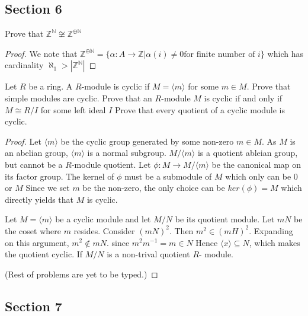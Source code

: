 \documentclass[Aluffi.tex]{subfiles}
\begin{document}
\subsection{Section 6}

\begin{problem}
Prove that $\mathbb{Z}^{\mathbb{N}} \not\cong \mathbb{Z}^{\oplus \mathbb{N}}$
\end{problem}

\begin{proof}
We note that $\mathbb{Z}^{\oplus \mathbb{N}} = \{ \alpha: A \rightarrow \mathbb{Z} \vert \alpha(i) \neq 0 \text{for finite number of $i$} \}$ which has cardinality $\aleph_1 > |\mathbb{Z}^{\mathbb{N}}|$ 
\end{proof}


\begin{problem}
Let $R$ be a ring. A $R$-module is cyclic if $M = \langle m \rangle$ for some $m \in M$. Prove that simple modules are cyclic. Prove that an $R$-module $M$ is cyclic if and only if $M \cong R/I$ for some left ideal $I$ Prove that every quotient of a cyclic module is cyclic. 
\end{problem}

\begin{proof}
Let $\langle m \rangle$ be the cyclic group generated by some non-zero $m \in M$. As $M$ is an abelian group, $\langle m \rangle$ is a normal subgroup. $M / \langle m \rangle$ is a quotient ableian group, but cannot be a $R$-module quotient. Let $\phi: M \rightarrow M / {\langle m \rangle}$ be the canonical map on its factor group.
The kernel of $\phi$ must be a submodule of $M$ which only can be $0$ or $M$ Since we set $m$ be the non-zero, the only choice can be $ker(\phi) = M$ which directly yields that $M$ is cyclic. \par
Let $M = \langle m \rangle$ be a cyclic module and let $M/N$ be its quotient module. Let $mN$ be the coset where $m$ resides. Consider $(mN)^2$. Then $m^2 \in (mH)^2$.  Expanding on this argument, $m^2 \not\in mN$. 
since $m^2m^{-1} = m \in N$ Hence $\langle x \rangle \subseteq N$, which makes the quotient cyclic.
If $M/N$ is a non-trival quotient $R$- module.  

(Rest of problems are yet to be typed.) 
\end{proof}

\subsection{Section 7}
\end{document}
